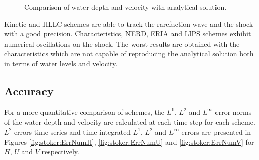 \begin{figure}[H]
\begin{minipage}[t]{0.5\textwidth}
 \centering
\end{minipage}
\begin{minipage}[t]{0.5\textwidth}
 \centering
\end{minipage}
\begin{minipage}[t]{0.5\textwidth}
 \centering
\end{minipage}
\begin{minipage}[t]{0.5\textwidth}
 \centering
\end{minipage}
\begin{minipage}[t]{0.5\textwidth}
 \centering
\end{minipage}
\begin{minipage}[t]{0.5\textwidth}
 \centering
\end{minipage}
  \caption{Comparison of water depth and velocity with analytical solution.}
  \label{fig:stoker:comparison}
\end{figure}

Kinetic and HLLC schemes are able to track the rarefaction wave and the shock
with a good precision.
Characteristics, NERD, ERIA and LIPS schemes exhibit numerical oscillations
on the shock.
The worst results are obtained with the characteristics which are not capable of
reproducing the analytical solution both in terms of water levels and velocity.

\subsection{Accuracy}

For a more quantitative comparison of schemes, the $L^1$, $L^2$ and $L^\infty$
error norms of the water depth and velocity are calculated at each time step for
each scheme.
$L^2$ errors time series and time integrated $L^1$, $L^2$ and $L^\infty$ errors
are presented in Figures \ref{fig:stoker:ErrNumH}, \ref{fig:stoker:ErrNumU} and
\ref{fig:stoker:ErrNumV} for $H$, $U$ and $V$ respectively.


